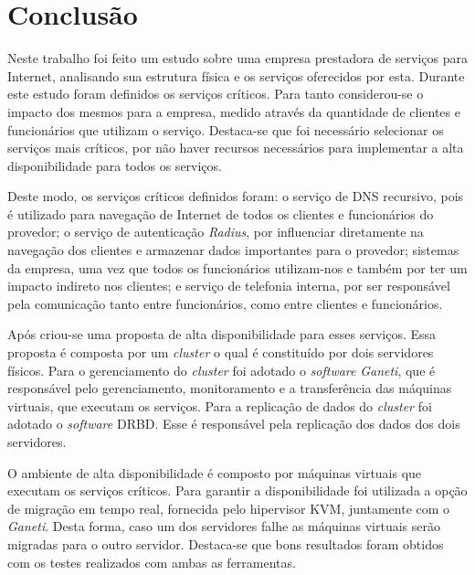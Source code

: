\chapter{Conclusão}
\label{cap:conclusao}

Neste trabalho foi feito um estudo sobre uma empresa prestadora de serviços para Internet, analisando sua estrutura física e os serviços oferecidos 
por esta. Durante este estudo foram definidos os serviços críticos. Para tanto considerou-se o impacto dos mesmos para a empresa, medido através
da quantidade de clientes e funcionários que utilizam o serviço. Destaca-se que foi necessário selecionar os serviços mais críticos, por não 
haver recursos necessários para implementar a alta disponibilidade para todos os serviços.

Deste modo, os serviços críticos definidos foram: o serviço de \ac{DNS} recursivo, pois é utilizado para navegação de Internet de todos os clientes 
e funcionários do provedor; o serviço de autenticação \textit{Radius}, por influenciar diretamente na navegação dos clientes e armazenar dados 
importantes para o provedor; sistemas da empresa, uma vez que todos os funcionários utilizam-nos e também por ter um impacto indireto nos 
clientes; e serviço de telefonia interna, por ser responsável pela comunicação tanto entre funcionários, como entre clientes e funcionários.

Após criou-se uma proposta de alta disponibilidade para esses serviços. Essa proposta é composta por um \textit{cluster} o qual é constituído 
por dois servidores físicos. Para o gerenciamento do \textit{cluster} foi adotado o \textit{software} \textit{Ganeti}, que é responsável pelo 
gerenciamento, monitoramento e a transferência das máquinas virtuais, que executam os serviços. Para a replicação de dados 
do \textit{cluster} foi adotado o \textit{software} \ac{DRBD}. Esse é responsável pela replicação dos dados dos dois servidores.

O ambiente de alta disponibilidade é composto por máquinas virtuais que executam os serviços críticos. Para garantir a disponibilidade 
foi utilizada a opção de migração em tempo real, fornecida pelo hipervisor \ac{KVM}, juntamente com o \textit{Ganeti}. Desta forma, 
caso um dos servidores falhe as máquinas virtuais serão migradas para o outro servidor. Destaca-se que bons resultados foram obtidos com os 
testes realizados com ambas as ferramentas.



